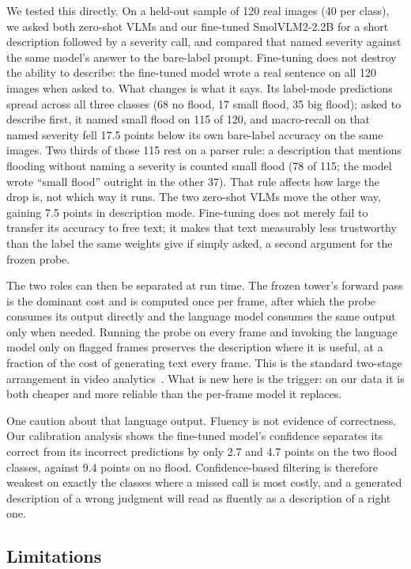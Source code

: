 \documentclass[conference]{IEEEtran}
\begin{document}
We tested this directly. On a held-out sample of 120 real images (40 per class), we asked both zero-shot VLMs and our fine-tuned SmolVLM2-2.2B for a short description followed by a severity call, and compared that named severity against the same model's answer to the bare-label prompt. Fine-tuning does not destroy the ability to describe: the fine-tuned model wrote a real sentence on all 120 images when asked to. What changes is what it says. Its label-mode predictions spread across all three classes (68 no flood, 17 small flood, 35 big flood); asked to describe first, it named small flood on 115 of 120, and macro-recall on that named severity fell 17.5 points below its own bare-label accuracy on the same images. Two thirds of those 115 rest on a parser rule: a description that mentions flooding without naming a severity is counted small flood (78 of 115; the model wrote ``small flood'' outright in the other 37). That rule affects how large the drop is, not which way it runs. The two zero-shot VLMs move the other way, gaining 7.5 points in description mode. Fine-tuning does not merely fail to transfer its accuracy to free text; it makes that text measurably less trustworthy than the label the same weights give if simply asked, a second argument for the frozen probe.

The two roles can then be separated at run time. The frozen tower's forward pass is the dominant cost and is computed once per frame, after which the probe consumes its output directly and the language model consumes the same output only when needed. Running the probe on every frame and invoking the language model only on flagged frames preserves the description where it is useful, at a fraction of the cost of generating text every frame. This is the standard two-stage arrangement in video analytics~\cite{kang2017noscope}. What is new here is the trigger: on our data it is both cheaper and more reliable than the per-frame model it replaces.

One caution about that language output. Fluency is not evidence of correctness. Our calibration analysis shows the fine-tuned model's confidence separates its correct from its incorrect predictions by only 2.7 and 4.7 points on the two flood classes, against 9.4 points on no flood. Confidence-based filtering is therefore weakest on exactly the classes where a missed call is most costly, and a generated description of a wrong judgment will read as fluently as a description of a right one.

\subsection{Limitations}
\label{sec:limitations}
\end{document}
